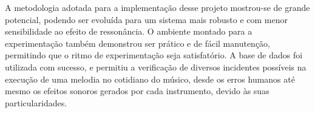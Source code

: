 A metodologia adotada para a implementação desse projeto mostrou-se de grande potencial, podendo ser evoluída para um sistema mais robusto e com menor sensibilidade ao efeito de ressonância. O ambiente montado para a experimentação também demonstrou ser prático e de fácil manutenção, permitindo que o ritmo de experimentação seja satisfatório. A base de dados foi utilizada com sucesso, e permitiu a verificação de diversos incidentes possíveis na execução de uma melodia no cotidiano do músico, desde os erros humanos até mesmo os efeitos sonoros gerados por cada instrumento, devido às suas particularidades.

